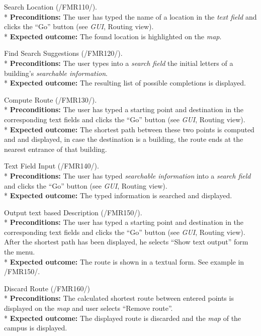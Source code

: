 \begin{numerate}[RTC]
\item Search Location (/FMR110/). \\*
	\textbf{Preconditions:} The user has typed the name of a location in the \textit{text field} and clicks the ``Go'' button (see \textit{GUI}, Routing view). \\*
	\textbf{Expected outcome:} The found location is highlighted on the \textit{map}.
\item Find Search Suggestions (/FMR120/). \\*
	\textbf{Preconditions:} The user types into a \textit{search field} the initial letters of a building's \textit{searchable information}.\\*
	\textbf{Expected outcome:} The resulting list of possible completions is displayed.
\item Compute Route (/FMR130/). \\*
	\textbf{Preconditions:} The user has typed a starting point and destination in the corresponding text fields and clicks the ``Go'' button (see \textit{GUI}, Routing view). \\*
	\textbf{Expected outcome:} The shortest path between these two points is computed and and displayed, in case the destination is a building, the route ends at the nearest entrance of that building.
\item Text Field Input (/FMR140/). \\*
	\textbf{Preconditions:} The user has typed \textit{searchable information} into a \textit{search field} and clicks the ``Go'' button (see \textit{GUI}, Routing view). \\*
	\textbf{Expected outcome:} The typed information is searched and displayed.
\item Output text based Description (/FMR150/). \\*
	\textbf{Preconditions:} The user has typed a starting point and destination in the corresponding text fields and clicks the ``Go'' button (see \textit{GUI}, Routing view). After the shortest path has been displayed, he selects ``Show text output'' form the menu. \\*
	\textbf{Expected outcome:} The route is shown in a textual form. See example in /FMR150/.
\item Discard Route (/FMR160/)\\*
	\textbf{Preconditions:} The calculated shortest route between entered points is displayed on the \textit{map} and user selects ``Remove route''. \\*
	\textbf{Expected outcome:} The displayed route is discarded and the \textit{map} of the campus is displayed.
\end{numerate}

